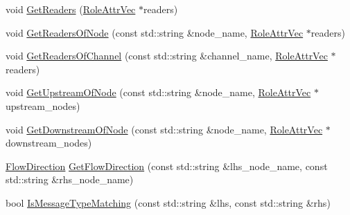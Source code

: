 \begin{DoxyCompactItemize}
void \hyperlink{classapollo_1_1cyber_1_1service__discovery_1_1ChannelManager_ae33f40f1a1e771b70e114b661bdeccd7}{Get\-Readers} (\hyperlink{classapollo_1_1cyber_1_1service__discovery_1_1ChannelManager_a3690fc3677abdb994d1de9b996f66cf6}{Role\-Attr\-Vec} $\ast$readers)
\item 
void \hyperlink{classapollo_1_1cyber_1_1service__discovery_1_1ChannelManager_a24c51f2ba8f6cf15fb7c3f44baf496d1}{Get\-Readers\-Of\-Node} (const std\-::string \&node\-\_\-name, \hyperlink{classapollo_1_1cyber_1_1service__discovery_1_1ChannelManager_a3690fc3677abdb994d1de9b996f66cf6}{Role\-Attr\-Vec} $\ast$readers)
\item 
void \hyperlink{classapollo_1_1cyber_1_1service__discovery_1_1ChannelManager_ad20c8af51bdacf9f1a6ecf7ce7bb371d}{Get\-Readers\-Of\-Channel} (const std\-::string \&channel\-\_\-name, \hyperlink{classapollo_1_1cyber_1_1service__discovery_1_1ChannelManager_a3690fc3677abdb994d1de9b996f66cf6}{Role\-Attr\-Vec} $\ast$readers)
\item 
void \hyperlink{classapollo_1_1cyber_1_1service__discovery_1_1ChannelManager_a4d77d8400933c94b6338c9fea4b91d8b}{Get\-Upstream\-Of\-Node} (const std\-::string \&node\-\_\-name, \hyperlink{classapollo_1_1cyber_1_1service__discovery_1_1ChannelManager_a3690fc3677abdb994d1de9b996f66cf6}{Role\-Attr\-Vec} $\ast$upstream\-\_\-nodes)
\item 
void \hyperlink{classapollo_1_1cyber_1_1service__discovery_1_1ChannelManager_aff6f6c68372acdf0768804bba4a45898}{Get\-Downstream\-Of\-Node} (const std\-::string \&node\-\_\-name, \hyperlink{classapollo_1_1cyber_1_1service__discovery_1_1ChannelManager_a3690fc3677abdb994d1de9b996f66cf6}{Role\-Attr\-Vec} $\ast$downstream\-\_\-nodes)
\item 
\hyperlink{namespaceapollo_1_1cyber_1_1service__discovery_a463f9fa98e31287620adc568e1299c79}{Flow\-Direction} \hyperlink{classapollo_1_1cyber_1_1service__discovery_1_1ChannelManager_aefde1d2e4d5134dbf726fe1ad362246a}{Get\-Flow\-Direction} (const std\-::string \&lhs\-\_\-node\-\_\-name, const std\-::string \&rhs\-\_\-node\-\_\-name)
\item 
bool \hyperlink{classapollo_1_1cyber_1_1service__discovery_1_1ChannelManager_ad7a6a93c25b30eca132bd945f1771a59}{Is\-Message\-Type\-Matching} (const std\-::string \&lhs, const std\-::string \&rhs)
\end{DoxyCompactItemize}
